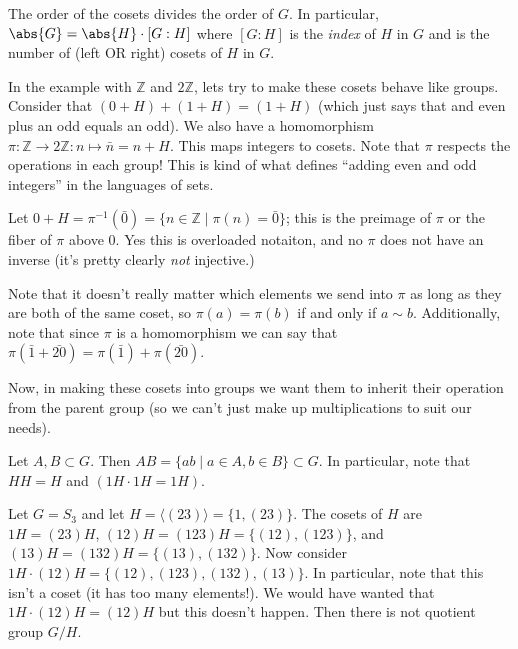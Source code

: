 \begin{corollary}
The order of the cosets divides the order of $G$. In particular, $\abs{G} = \abs{H} \cdot [G : H]$ where $[G : H]$ is the \emph{index} of $H$ in $G$ and is the number of (left OR right) cosets of $H$ in $G$.
\end{corollary}

In the example with $\mathbb{Z}$ and $2\mathbb{Z}$, lets try to make these cosets behave like groups. Consider that $(0 + H) + (1 + H) = (1 + H)$ (which just says that and even plus an odd equals an odd). We also have a homomorphism $\pi : \mathbb{Z} \to 2\mathbb{Z} : n \mapsto \bar{n} = n+H$. This maps integers to cosets. Note that $\pi$ respects the operations in each group! This is kind of what defines ``adding even and odd integers'' in the languages of sets.

\begin{notation}
Let $0+H = \pi^{-1}(\bar{0}) = \{n \in \mathbb{Z} \mid \pi(n) = \bar{0}\}$; this is the preimage of $\pi$ or the fiber of $\pi$ above $0$. Yes this is overloaded notaiton, and no $\pi$ does not have an inverse (it's pretty clearly \emph{not} injective.)
\end{notation}

Note that it doesn't really matter which elements we send into $\pi$ as long as they are both of the same coset, so $\pi(a) = \pi(b)$ if and only if $a \sim b$. Additionally, note that since $\pi$ is a homomorphism we can say that $\pi(\bar{1} + \bar{20}) = \pi(\bar{1}) + \pi(\bar{20})$.

Now, in making these cosets into groups we want them to inherit their operation from the parent group (so we can't just make up multiplications to suit our needs).

\begin{definition}
Let $A,B \subset G$. Then $AB = \{ab \mid a \in A, b \in B\} \subset G$. In particular, note that $HH = H$ and $(1H \cdot 1H = 1H)$.
\end{definition}

\begin{example}
Let $G = S_3$ and let $H = \langle (23) \rangle = \{1, (23)\}$. The cosets of $H$ are $1H = (23)H$, $(12)H = (123)H = \{(12), (123)\}$, and $(13)H = (132)H = \{(13), (132)\}$. Now consider $1H \cdot (12)H = \{(12), (123), (132), (13)\}$. In particular, note that this isn't a coset (it has too many elements!). We would have wanted that $1H \cdot (12)H = (12)H$ but this doesn't happen. Then there is not quotient group $G / H$.
\end{example}

